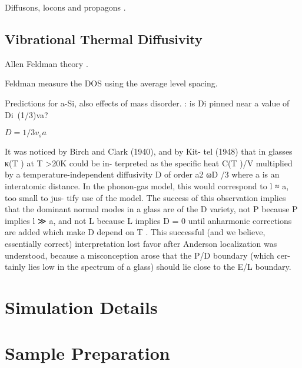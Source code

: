 \documentclass[aps,prb,preprint,superscriptaddress,amsmath,amssymb,floatfix]{revtex4}
\begin{document}
Diffusons, locons and propagons \cite{allen_diffusons_1999}.

\subsection{\label{S-Motivation}Vibrational Thermal Diffusivity}
Allen Feldman theory \cite{allen_thermal_1993}.

Feldman measure the DOS using the average level spacing.
\cite{feldman_numerical_1999} 

Predictions for a-Si, also effects of mass disorder.
\cite{feldman_thermal_1993}: is Di pinned near a value of Di~(1/3)va?

$D = 1/3 v_{s} a$

It was noticed by Birch and Clark (1940), and by Kit-
tel (1948) that in glasses κ(T ) at T >20K could be in-
terpreted as the specific heat C(T )/V multiplied by a
temperature-independent diffusivity D of order a2 ωD /3
where a is an interatomic distance. In the phonon-gas
model, this would correspond to l ≈ a, too small to jus-
tify use of the model. The success of this observation
implies that the dominant normal modes in a glass are of
the D variety, not P because P implies l ≫ a, and not L
because L implies D = 0 until anharmonic corrections are
added which make D depend on T . This successful (and
we believe, essentially correct) interpretation lost favor
after Anderson localization was understood, because a
misconception arose that the P/D boundary (which cer-
tainly lies low in the spectrum of a glass) should lie close
to the E/L boundary.

\clearpage



\section{\label{S:Simulation}Simulation Details}

\section{\label{S:Simulation}Sample Preparation}
\end{document}
